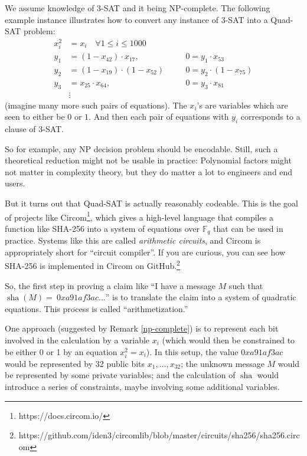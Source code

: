\begin{remark}
\label{np-complete}
We assume knowledge of 3-SAT and it
being NP-complete. The following example instance illustrates how to
convert any instance of 3-SAT into a Quad-SAT problem: \[\begin{aligned}
x_{i}^{2} & = x_{i}\quad\forall 1 \leq i \leq 1000 \\
y_{1} & = \left( 1 - x_{42} \right) \cdot x_{17}, & \quad & 0 = y_{1} \cdot x_{53} \\
y_{2} & = \left( 1 - x_{19} \right) \cdot \left( 1 - x_{52} \right) & \quad & 0 = y_{2} \cdot \left( 1 - x_{75} \right) \\
y_{3} & = x_{25} \cdot x_{64}, & \quad & 0 = y_{3} \cdot x_{81} \\
 & \vdots 
\end{aligned}\] (imagine many more such pairs of equations). The
\(x_i\)'s are variables which are seen to either be \(0\) or \(1\).
And then each pair of equations with \(y_{i}\) corresponds to a clause
of 3-SAT.
\end{remark}

So for example, any NP decision problem should be encodable. Still, such
a theoretical reduction might not be usable in practice: Polynomial
factors might not matter in complexity theory, but they do matter a lot
to engineers and end users.

But it turns out that Quad-SAT is actually reasonably codeable. This is
the goal of projects like Circom\footnote{https://docs.circom.io/},
which gives a high-level language that compiles a function like SHA-256
into a system of equations over \({\mathbb{F}}_{q}\) that can be used in
practice. Systems like this are called \emph{arithmetic circuits}, and
Circom is appropriately short for ``circuit compiler''. If you are
curious, you can see how SHA-256 is implemented in Circom on
GitHub.\footnote{https://github.com/iden3/circomlib/blob/master/circuits/sha256/sha256.circom}

So, the first step in proving a claim like ``I have a message \(M\) such
that \(\operatorname{sha}(M) = \ 0xa91af3ac...\)'' is to translate the
claim into a system of quadratic equations. This process is called
``arithmetization.''

One approach (suggested by Remark \ref{np-complete}) is
to represent each bit involved in the calculation by a variable
\(x_{i}\) (which would then be constrained to be either 0 or 1 by an
equation \(x_{i}^{2} = x_{i}\)). In this setup, the value \(0xa91af3ac\)
would be represented by 32 public bits \(x_{1},\ldots,x_{32}\); the
unknown message \(M\) would be represented by some private variables;
and the calculation of \(\operatorname{sha}\) would introduce a series
of constraints, maybe involving some additional variables.

